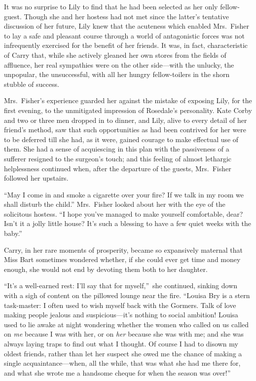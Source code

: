 \documentclass[12pt,a4paper]{book}
\begin{document}
It was no surprise to Lily to find that he had been selected as
her only fellow-guest. Though she and her hostess had not met
since the latter's tentative discussion of her future, Lily knew
that the acuteness which enabled Mrs.\ Fisher to lay a safe and
pleasant course through a world of antagonistic forces was not
infrequently exercised for the benefit of her friends. It was, in
fact, characteristic of Carry that, while she actively gleaned
her own stores from the fields of affluence, her real sympathies
were on the other side---with the unlucky, the unpopular, the
unsuccessful, with all her hungry fellow-toilers in the shorn
stubble of success.





Mrs.\ Fisher's experience guarded her against the mistake of
exposing Lily, for the first evening, to the unmitigated
impression of Rosedale's personality. Kate Corby and two
or three men dropped in to dinner, and Lily, alive to every
detail of her friend's method, saw that such opportunities as had
been contrived for her were to be deferred till she had, as it
were, gained courage to make effectual use of them. She had a
sense of acquiescing in this plan with the passiveness of a
sufferer resigned to the surgeon's touch; and this feeling of
almost lethargic helplessness continued when, after the departure
of the guests, Mrs.\ Fisher followed her upstairs.





``May I come in and smoke a cigarette over your fire? If we talk
in my room we shall disturb the child.'' Mrs.\ Fisher looked about
her with the eye of the solicitous hostess. ``I hope you've
managed to make yourself comfortable, dear? Isn't it a jolly
little house? It's such a blessing to have a few quiet weeks with
the baby.''





Carry, in her rare moments of prosperity, became so expansively
maternal that Miss Bart sometimes wondered whether, if she could
ever get time and money enough, she would not end by devoting
them both to her daughter.





``It's a well-earned rest: I'll say that for myself,''\ she
continued, sinking down with a sigh of content on the pillowed
lounge near the fire. ``Louisa Bry is a stern task-master: I often
used to wish myself back with the Gormers. Talk of love making
people jealous and suspicious---it's nothing to social ambition! 
Louisa used to lie awake at night wondering whether the women who
called on us called on \textit{me} because I was with her, or on \textit{her}
because she was with me; and she was always laying traps to find
out what I thought. Of course I had to disown my oldest friends,
rather than let her suspect she owed me the chance of making a
single acquaintance---when, all the while, that was what she had
me there for, and what she wrote me a handsome cheque for when
the season was over!''
\end{document}
